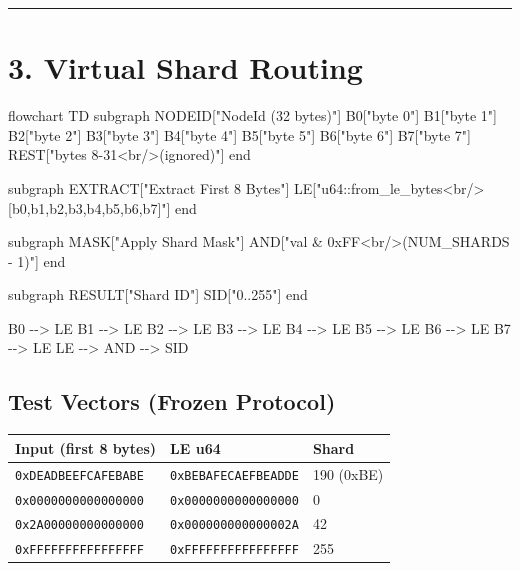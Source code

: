 \documentclass[
]{book}
\newenvironment{Shaded}{}{}
\newcommand{\NormalTok}[1]{#1}
\newcounter{none} %
\begin{document}
\begin{center}\rule{0.5\linewidth}{0.5pt}\end{center}

\section{3. Virtual Shard Routing}\label{virtual-shard-routing}

\begin{Shaded}
\begin{Highlighting}[]
\NormalTok{flowchart TD}
\NormalTok{    subgraph NODEID["NodeId (32 bytes)"]}
\NormalTok{        B0["byte 0"]}
\NormalTok{        B1["byte 1"]}
\NormalTok{        B2["byte 2"]}
\NormalTok{        B3["byte 3"]}
\NormalTok{        B4["byte 4"]}
\NormalTok{        B5["byte 5"]}
\NormalTok{        B6["byte 6"]}
\NormalTok{        B7["byte 7"]}
\NormalTok{        REST["bytes 8{-}31\textless{}br/\textgreater{}(ignored)"]}
\NormalTok{    end}

\NormalTok{    subgraph EXTRACT["Extract First 8 Bytes"]}
\NormalTok{        LE["u64::from\_le\_bytes\textless{}br/\textgreater{}[b0,b1,b2,b3,b4,b5,b6,b7]"]}
\NormalTok{    end}

\NormalTok{    subgraph MASK["Apply Shard Mask"]}
\NormalTok{        AND["val \& 0xFF\textless{}br/\textgreater{}(NUM\_SHARDS {-} 1)"]}
\NormalTok{    end}

\NormalTok{    subgraph RESULT["Shard ID"]}
\NormalTok{        SID["0..255"]}
\NormalTok{    end}

\NormalTok{    B0 {-}{-}\textgreater{} LE}
\NormalTok{    B1 {-}{-}\textgreater{} LE}
\NormalTok{    B2 {-}{-}\textgreater{} LE}
\NormalTok{    B3 {-}{-}\textgreater{} LE}
\NormalTok{    B4 {-}{-}\textgreater{} LE}
\NormalTok{    B5 {-}{-}\textgreater{} LE}
\NormalTok{    B6 {-}{-}\textgreater{} LE}
\NormalTok{    B7 {-}{-}\textgreater{} LE}
\NormalTok{    LE {-}{-}\textgreater{} AND {-}{-}\textgreater{} SID}
\end{Highlighting}
\end{Shaded}

\subsection{Test Vectors (Frozen
Protocol)}\label{test-vectors-frozen-protocol}

{\def\LTcaptype{none} %
\begin{longtable}[]{@{}lll@{}}
\toprule\noalign{}
Input (first 8 bytes) & LE u64 & Shard \\
\midrule\noalign{}
\endhead
\bottomrule\noalign{}
\endlastfoot
\texttt{0xDEADBEEFCAFEBABE} & \texttt{0xBEBAFECAEFBEADDE} & 190
(0xBE) \\
\texttt{0x0000000000000000} & \texttt{0x0000000000000000} & 0 \\
\texttt{0x2A00000000000000} & \texttt{0x000000000000002A} & 42 \\
\texttt{0xFFFFFFFFFFFFFFFF} & \texttt{0xFFFFFFFFFFFFFFFF} & 255 \\
\end{longtable}
}
\end{document}
